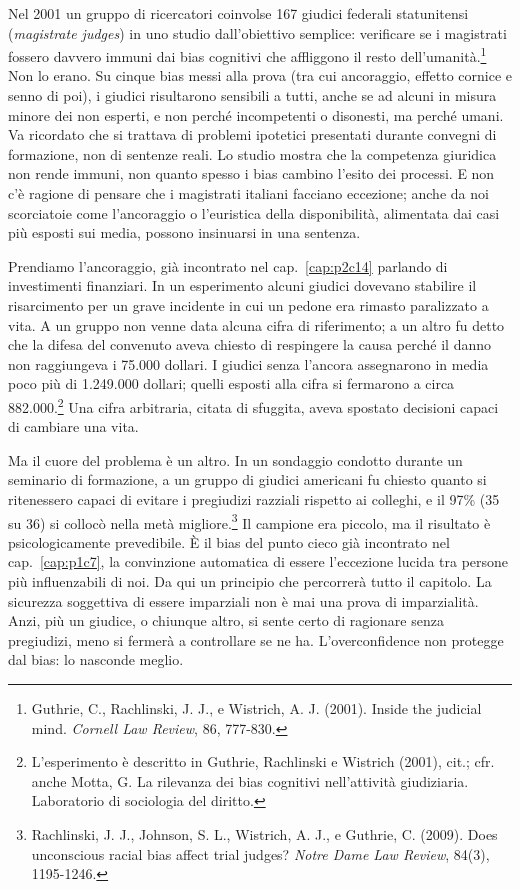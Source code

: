 Nel 2001 un gruppo di ricercatori coinvolse 167 giudici federali statunitensi (\textit{magistrate judges}) in uno studio dall'obiettivo semplice: verificare se i magistrati fossero davvero immuni dai bias cognitivi che affliggono il resto dell'umanit\`{a}.\footnote{Guthrie, C., Rachlinski, J. J., e Wistrich, A. J. (2001). Inside the judicial mind. \textit{Cornell Law Review}, 86, 777-830.} Non lo erano. Su cinque bias messi alla prova (tra cui ancoraggio, effetto cornice e senno di poi), i giudici risultarono sensibili a tutti, anche se ad alcuni in misura minore dei non esperti, e non perch\'{e} incompetenti o disonesti, ma perch\'{e} umani. Va ricordato che si trattava di problemi ipotetici presentati durante convegni di formazione, non di sentenze reali. Lo studio mostra che la competenza giuridica non rende immuni, non quanto spesso i bias cambino l'esito dei processi. E non c'\`{e} ragione di pensare che i magistrati italiani facciano eccezione; anche da noi scorciatoie come l'ancoraggio o l'euristica della disponibilit\`{a}, alimentata dai casi pi\`{u} esposti sui media, possono insinuarsi in una sentenza.

Prendiamo l'ancoraggio, gi\`{a} incontrato nel cap.~\ref{cap:p2c14} parlando di investimenti finanziari. In un esperimento alcuni giudici dovevano stabilire il risarcimento per un grave incidente in cui un pedone era rimasto paralizzato a vita. A un gruppo non venne data alcuna cifra di riferimento; a un altro fu detto che la difesa del convenuto aveva chiesto di respingere la causa perch\'{e} il danno non raggiungeva i 75.000 dollari. I giudici senza l'ancora assegnarono in media poco pi\`{u} di 1.249.000 dollari; quelli esposti alla cifra si fermarono a circa 882.000.\footnote{L'esperimento \`{e} descritto in Guthrie, Rachlinski e Wistrich (2001), cit.; cfr. anche Motta, G. La rilevanza dei bias cognitivi nell'attivit\`{a} giudiziaria. Laboratorio di sociologia del diritto.} Una cifra arbitraria, citata di sfuggita, aveva spostato decisioni capaci di cambiare una vita.

Ma il cuore del problema \`{e} un altro. In un sondaggio condotto durante un seminario di formazione, a un gruppo di giudici americani fu chiesto quanto si ritenessero capaci di evitare i pregiudizi razziali rispetto ai colleghi, e il 97\% (35 su 36) si collocò nella metà migliore.\footnote{Rachlinski, J. J., Johnson, S. L., Wistrich, A. J., e Guthrie, C. (2009). Does unconscious racial bias affect trial judges? \textit{Notre Dame Law Review}, 84(3), 1195-1246.} Il campione era piccolo, ma il risultato \`{e} psicologicamente prevedibile. \`{E} il bias del punto cieco gi\`{a} incontrato nel cap.~\ref{cap:p1c7}, la convinzione automatica di essere l'eccezione lucida tra persone pi\`{u} influenzabili di noi. Da qui un principio che percorrer\`{a} tutto il capitolo. La sicurezza soggettiva di essere imparziali non \`{e} mai una prova di imparzialit\`{a}. Anzi, pi\`{u} un giudice, o chiunque altro, si sente certo di ragionare senza pregiudizi, meno si fermer\`{a} a controllare se ne ha. L'overconfidence non protegge dal bias: lo nasconde meglio.

